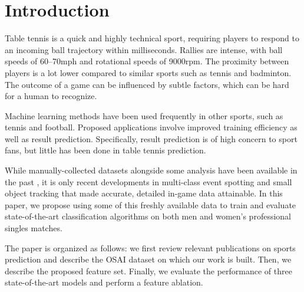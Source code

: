 \section{Introduction}
Table tennis is a quick and highly technical sport, requiring players to respond to an incoming ball trajectory within milliseconds. Rallies are intense, with ball speeds of 60--70mph and rotational speeds of 9000rpm. The proximity between players is  a lot lower compared to similar sports such as tennis and badminton. The  outcome of a game can be influenced by subtle factors, which can be hard for a human to recognize.

Machine learning methods have been used frequently  in other sports, such as tennis and football. Proposed applications involve improved training efficiency 
as well as result prediction. Specifically, result prediction is of high concern to sport fans, but little has been done in table tennis prediction.


While manually-collected datasets alongside some analysis have been available in the past \cite{wang2019tac}, it is only recent developments in  multi-class event spotting and small object tracking that made accurate, detailed in-game data attainable.
In this paper, we propose using some of this freshly available data to train and evaluate  state-of-the-art classification algorithms on both men and women's professional singles matches. %



The paper is organized as follows: we first review relevant publications on sports prediction and describe the OSAI dataset on which our work is built. Then, we describe the proposed feature set. Finally, we evaluate the performance of three state-of-the-art models and perform a feature ablation.